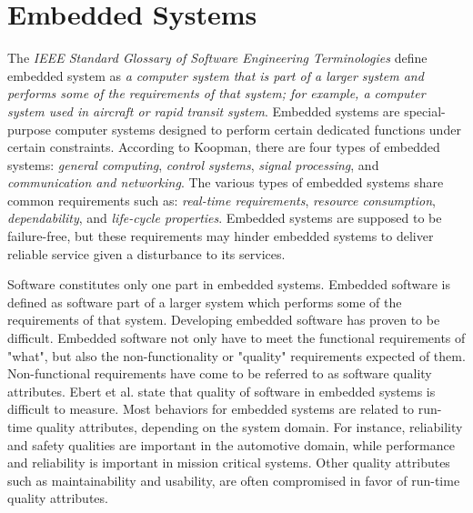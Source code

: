 
\section{Embedded Systems}
\label{sec:embeddedsystems}
The \textit{IEEE Standard Glossary of Software Engineering Terminologies} define embedded system as \textit{a computer system that is part of a larger system and performs some of the requirements of that system; for example, a computer system used in aircraft or rapid transit system}\cite{radatz1990ieee}. Embedded systems are special-purpose computer systems designed to perform certain dedicated functions under certain constraints. According to Koopman\cite{koopman1999embedded}, there are four types of embedded systems: \textit{general computing}, \textit{control systems}, \textit{signal processing}, and \textit{communication and networking}. The various types of embedded systems share common requirements such as: \textit{real-time requirements}, \textit{resource consumption}, \textit{dependability}, and \textit{life-cycle properties}\cite{crnkovic2004component}. Embedded systems are supposed to be failure-free\cite{you2013reliability}, but these requirements may hinder embedded systems to deliver reliable service given a disturbance to its services\cite{patil2009embedded}. 

Software constitutes only one part in embedded systems. Embedded software is defined as software part of a larger system which performs some of the requirements of that system\cite{radatz1990ieee}. Developing embedded software has proven to be difficult\cite{ebert2009embedded,sherman2008quality}. Embedded software not only have to meet the functional requirements of "what", but also the non-functionality or "quality" requirements expected of them\cite{sherman2008quality}. Non-functional requirements have come to be referred to as software quality attributes. Ebert et al.\cite{ebert2009embedded} state that quality of software in embedded systems is difficult to measure. Most behaviors for embedded systems are related to run-time quality attributes, depending on the system domain. For instance, reliability and safety qualities are important in the automotive domain\cite{pretschner2007software}, while performance and reliability is important in mission critical systems\cite{trienekens2010quality}. Other quality attributes such as maintainability and usability, are often compromised in favor of run-time quality attributes.


